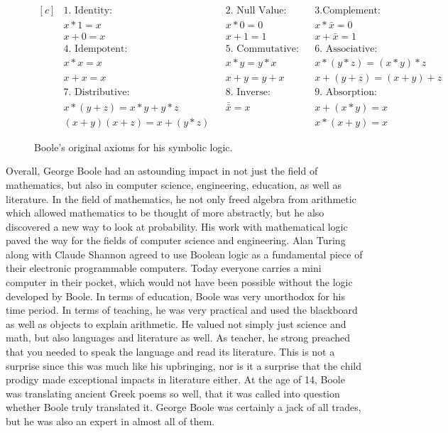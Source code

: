 \documentclass[12]{article} %
\begin{document}
\begin{figure}[H]
\begin{equation*}
\begin{aligned}[c]
&1.\text{ Identity:}		&	&2.\text{ Null Value:}		&	&3.\text{Complement:}\\
&x*1 = x				&	&x*0 = 0				&	&x*\bar{x} = 0\\
&x + 0 = x				&	&x + 1 = 1				&	&x + \bar{x} = 1\\
&4.\text{ Idempotent:}	&	&5.\text{ Commutative:}	&	&6.\text{ Associative:}\\
&x*x = x				&	&x*y = y*x				&	&x*(y*z) = (x*y)*z\\
&x + x = x				&	&x + y = y + x			&	&x+(y+z) = (x+y)+z\\
&7.\text{ Distributive:}	&	&8.\text{ Inverse:}		&	&9.\text{ Absorption:}\\
&x*(y+z) = x*y + y*z		&	&\bar{\bar{x}} = x		&	&x+(x*y) = x\\
&(x+y)(x+z) = x + (y*z)	&	&					&	&x*(x+y) = x
\end{aligned}
\end{equation*}
\caption{Boole's original axioms for his symbolic logic.}\label{fig4}
\end{figure}

Overall, George Boole had an astounding impact in not just the field of mathematics, but also in computer science, engineering, education, as well as literature.  In the field of mathematics, he not only freed algebra from arithmetic which allowed mathematics to be thought of more abstractly, but he also discovered a new way to look at probability. His work with mathematical logic paved the way for the fields of computer science and engineering. Alan Turing along with Claude Shannon agreed to use Boolean logic as a fundamental piece of their electronic programmable computers. Today everyone carries a mini computer in their pocket, which would not have been possible without the logic developed by Boole. In terms of education, Boole was very unorthodox for his time period. In terms of teaching, he was very practical and used the blackboard as well as objects to explain arithmetic. He valued not simply just science and math, but also languages and literature as well. As teacher, he strong preached that you needed to speak the language and read its literature. This is not a surprise since this was much like his upbringing, nor is it a surprise that the child prodigy made exceptional impacts in literature either. At the age of 14, Boole was translating ancient Greek poems so well, that it was called into question whether Boole truly translated it. George Boole was certainly a jack of all trades, but he was also an expert in almost all of them. 
\end{document}
